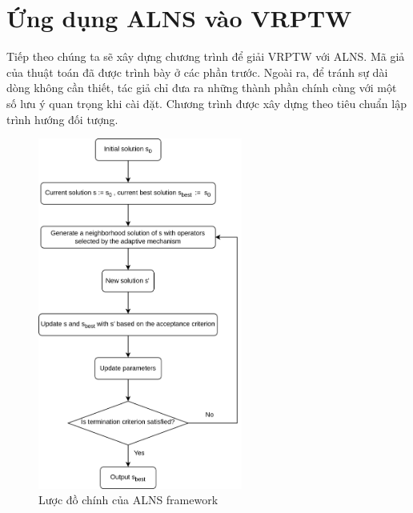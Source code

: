 \chapter{Ứng dụng ALNS vào VRPTW}
\label{chap:application}

Tiếp theo chúng ta sẽ xây dựng chương trình để giải VRPTW với ALNS. Mã giả của thuật toán đã được trình bày ở các phần trước. Ngoài ra, để tránh sự dài dòng không cần thiết, tác giả chỉ đưa ra những thành phần chính cùng với một số lưu ý quan trọng khi cài đặt. Chương trình được xây dựng theo tiêu chuẩn lập trình hướng đối tượng.

\begin{figure}[H] %
  \centering %
  \includegraphics[width=0.6\textwidth]{figures/ALNS-flowchart.png} 
  \caption{Lược đồ chính của ALNS framework} 
\end{figure}


